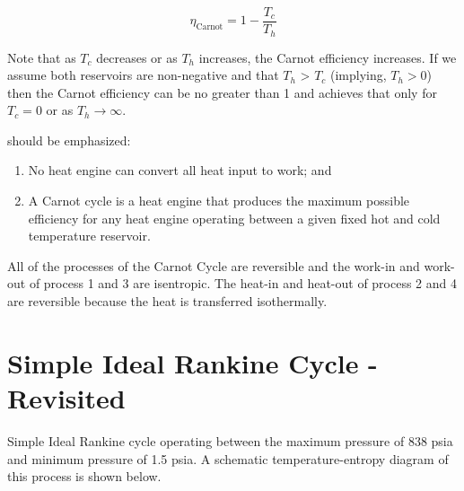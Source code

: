 $$ \eta_{\text{Carnot}} = 1 - \frac{T_c}{T_h}$$ 

Note that as $T_c$ decreases or as $T_h$ increases, the Carnot efficiency increases.  If we assume both reservoirs are non-negative and that $T_h$ > $T_c$ (implying, $T_h > 0$) then the Carnot efficiency can be no greater than 1 and achieves that only for $T_c=0$ or as $T_h \rightarrow \infty$.  

 should be emphasized:
\begin{enumerate}
\item No heat engine can convert all heat input to work; and
\item A Carnot cycle is a heat engine that produces the maximum possible efficiency for any heat engine operating between a given fixed hot and cold temperature reservoir.
\end{enumerate}

All of the processes of the Carnot Cycle are reversible and the work-in and work-out of process 1 and 3 are isentropic.  The heat-in and heat-out of process 2 and 4 are reversible because the heat is transferred isothermally.

\section{Simple Ideal Rankine Cycle - Revisited}
 Simple Ideal Rankine cycle operating between the maximum pressure of 838 psia and minimum pressure of 1.5 psia.  A schematic temperature-entropy diagram of this process is shown below.


